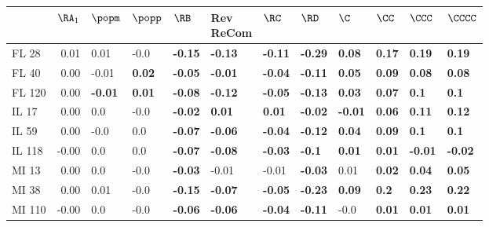 \begin{tabular}{lrllllllllll}
\toprule
{} &  $\RA_1$ &         $\popm$ &        $\popp$ &           $\RB$ & \makecell{Rev \\ ReCom} &           $\RC$ &           $\RD$ &            $\C$ &          $\CC$ &          $\CCC$ &         $\CCCC$ \\
\midrule
FL 28   &     0.01 &            0.01 &           -0.0 &  \textbf{-0.15} &          \textbf{-0.13} &  \textbf{-0.11} &  \textbf{-0.29} &   \textbf{0.08} &  \textbf{0.17} &   \textbf{0.19} &   \textbf{0.19} \\
FL 40   &     0.00 &           -0.01 &  \textbf{0.02} &  \textbf{-0.05} &          \textbf{-0.01} &  \textbf{-0.04} &  \textbf{-0.11} &   \textbf{0.05} &  \textbf{0.09} &   \textbf{0.08} &   \textbf{0.08} \\
FL 120  &     0.00 &  \textbf{-0.01} &  \textbf{0.01} &  \textbf{-0.08} &          \textbf{-0.12} &  \textbf{-0.05} &  \textbf{-0.13} &   \textbf{0.03} &  \textbf{0.07} &    \textbf{0.1} &    \textbf{0.1} \\
IL 17   &     0.00 &             0.0 &           -0.0 &  \textbf{-0.02} &           \textbf{0.01} &   \textbf{0.01} &  \textbf{-0.02} &  \textbf{-0.01} &  \textbf{0.06} &   \textbf{0.11} &   \textbf{0.12} \\
IL 59   &     0.00 &            -0.0 &            0.0 &  \textbf{-0.07} &          \textbf{-0.06} &  \textbf{-0.04} &  \textbf{-0.12} &   \textbf{0.04} &  \textbf{0.09} &    \textbf{0.1} &    \textbf{0.1} \\
IL 118  &    -0.00 &             0.0 &            0.0 &  \textbf{-0.07} &          \textbf{-0.08} &  \textbf{-0.03} &   \textbf{-0.1} &   \textbf{0.01} &  \textbf{0.01} &  \textbf{-0.01} &  \textbf{-0.02} \\
MI 13   &     0.00 &             0.0 &           -0.0 &  \textbf{-0.03} &                   -0.01 &           -0.01 &  \textbf{-0.03} &            0.01 &  \textbf{0.02} &   \textbf{0.04} &   \textbf{0.05} \\
MI 38   &     0.00 &            0.01 &           -0.0 &  \textbf{-0.15} &          \textbf{-0.07} &  \textbf{-0.05} &  \textbf{-0.23} &   \textbf{0.09} &   \textbf{0.2} &   \textbf{0.23} &   \textbf{0.22} \\
MI 110  &    -0.00 &             0.0 &           -0.0 &  \textbf{-0.06} &          \textbf{-0.06} &  \textbf{-0.04} &  \textbf{-0.11} &            -0.0 &  \textbf{0.01} &   \textbf{0.01} &   \textbf{0.01} \\

\end{tabular}
